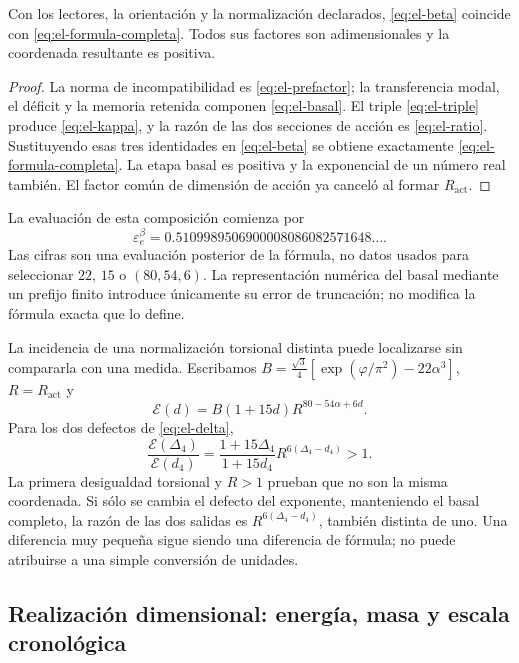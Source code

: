 \begin{theorem}
Con los lectores, la orientación y la normalización declarados,
\eqref{eq:el-beta} coincide con \eqref{eq:el-formula-completa}. Todos
sus factores son adimensionales y la coordenada resultante es positiva.
\end{theorem}
\begin{proof}
La norma de incompatibilidad es \eqref{eq:el-prefactor}; la transferencia modal,
el déficit y la memoria retenida componen \eqref{eq:el-basal}. El
triple \eqref{eq:el-triple} produce \eqref{eq:el-kappa}, y la razón de
las dos secciones de acción es \eqref{eq:el-ratio}. Sustituyendo esas
tres identidades en \eqref{eq:el-beta} se obtiene exactamente
\eqref{eq:el-formula-completa}. La etapa basal es positiva y la
exponencial de un número real también. El factor común de dimensión de
acción ya canceló al formar \(R_{\mathrm{act}}\).
\end{proof}

La evaluación de esta composición comienza por
\begin{equation}
 \varepsilon_e^\beta
 =0.5109989506900008086082571648\ldots.
 \label{eq:el-beta-decimal}
\end{equation}
Las cifras son una evaluación posterior de la fórmula, no datos usados
para seleccionar \(22\), \(15\) o \((80,54,6)\). La representación
numérica del basal mediante un prefijo finito introduce únicamente su
error de truncación; no modifica la fórmula exacta que lo define.

La incidencia de una normalización torsional distinta puede localizarse
sin compararla con una medida. Escribamos
\(B=\frac{\sqrt3}{4}[\exp(\varphi/\pi^2)-22\alpha^3]\),
\(R=R_{\mathrm{act}}\) y
\[
 \mathcal E(d)=B(1+15d)R^{80-54\alpha+6d}.
\]
Para los dos defectos de \eqref{eq:el-delta},
\begin{equation}
 \frac{\mathcal E(\Delta_4)}{\mathcal E(d_4)}
 =\frac{1+15\Delta_4}{1+15d_4}
   R^{6(\Delta_4-d_4)}>1.
 \label{eq:el-normalizacion-beta}
\end{equation}
La primera desigualdad torsional y \(R>1\) prueban que no son la misma
coordenada. Si sólo se cambia el defecto del exponente, manteniendo el
basal completo, la razón de las dos salidas es
\(R^{6(\Delta_4-d_4)}\), también distinta de uno. Una diferencia muy
pequeña sigue siendo una diferencia de fórmula; no puede atribuirse a
una simple conversión de unidades.

\subsection{Realización dimensional: energía, masa y escala cronológica}

